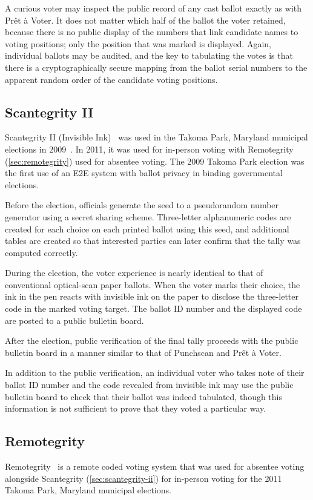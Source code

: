 A curious voter may inspect the public record of any cast ballot
exactly as with Prêt à Voter. It does not matter which half of the
ballot the voter retained, because there is no public display of the
numbers that link candidate names to voting positions; only the
position that was marked is displayed. Again, individual ballots may
be audited, and the key to tabulating the votes is that there is a
cryptographically secure mapping from the ballot serial numbers to the
apparent random order of the candidate voting positions.

\subsection{Scantegrity II}
\label{sec:scantegrity-ii}

Scantegrity II (Invisible Ink)~\cite{chaum2008,chaum2009} was used in
the Takoma Park, Maryland municipal elections in
2009~\cite{carback2010}. In 2011, it was used for in-person voting
with Remotegrity (\autoref{sec:remotegrity}) used for absentee voting. The
2009 Takoma Park election was the first use of an E2E system with
ballot privacy in binding governmental elections.

Before the election, officials generate the seed to a pseudorandom
number generator using a secret sharing scheme. Three-letter
alphanumeric codes are created for each choice on each printed ballot
using this seed, and additional tables are created so that interested
parties can later confirm that the tally was computed correctly.

During the election, the voter experience is nearly identical to that
of conventional optical-scan paper ballots. When the voter marks their
choice, the ink in the pen reacts with invisible ink on the paper to
disclose the three-letter code in the marked voting target. The ballot
ID number and the displayed code are posted to a public bulletin
board.

After the election, public verification of the final tally proceeds
with the public bulletin board in a manner similar to that of
Punchscan and Prêt à Voter.

In addition to the public verification, an individual voter who takes
note of their ballot ID number and the code revealed from invisible
ink may use the public bulletin board to check that their ballot was
indeed tabulated, though this information is not sufficient to prove
that they voted a particular way.

\subsection{Remotegrity}
\label{sec:remotegrity}
Remotegrity~\cite{zagorski2013} is a remote coded voting system that
was used for absentee voting alongside Scantegrity
(\autoref{sec:scantegrity-ii}) for in-person voting for the 2011
Takoma Park, Maryland municipal elections.

